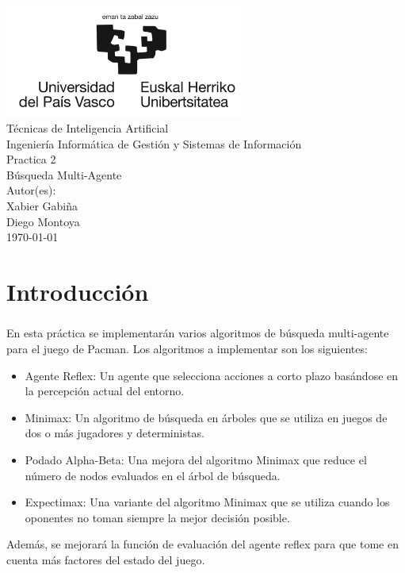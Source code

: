 \documentclass{report}
\begin{document}
    \begin{titlepage}
        \centering
        \includegraphics[width=0.6\textwidth]{./.img/logo.jpg}\\
        \vspace{1cm}
        \LARGE Técnicas de Inteligencia Artificial\\
        \vspace{0.5cm}
        \Large Ingeniería Informática de Gestión y Sistemas de Información\\
        \vspace{3cm}
        \Huge Practica 2\\
        \huge Búsqueda Multi-Agente\\
        \vspace{2.5cm}
        \Large Autor(es):\\
        \vspace{0.2cm}
        \large Xabier Gabiña\\
        \large Diego Montoya\\
        \vfill
        \today
    \end{titlepage}
    \tableofcontents
    \listoffigures
    \listoftables
    \lstlistoflistings
    \chapter{Introducción}
      \paragraph*{}{
        En esta práctica se implementarán varios algoritmos de búsqueda multi-agente para el juego de Pacman. 
        Los algoritmos a implementar son los siguientes:
        \begin{itemize}
          \item Agente Reflex: Un agente que selecciona acciones a corto plazo basándose en la percepción actual del entorno.
          \item Minimax: Un algoritmo de búsqueda en árboles que se utiliza en juegos de dos o más jugadores y deterministas.
          \item Podado Alpha-Beta: Una mejora del algoritmo Minimax que reduce el número de nodos evaluados en el árbol de búsqueda.
          \item Expectimax: Una variante del algoritmo Minimax que se utiliza cuando los oponentes no toman siempre la mejor decisión posible.
        \end{itemize}
        Además, se mejorará la función de evaluación del agente reflex para que tome en cuenta más factores del estado del juego.
      }
\end{document}
